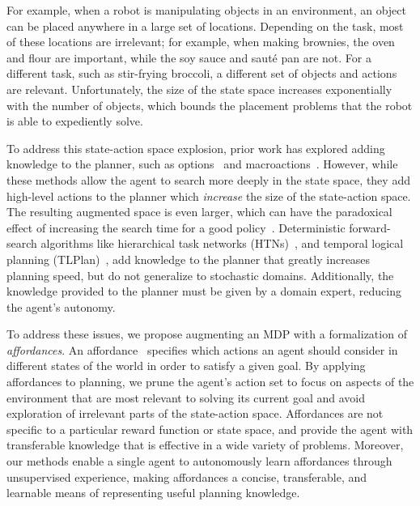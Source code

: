 \documentclass[conference]{IEEEtran}
\begin{document}
For example, when a robot is manipulating objects in an environment,
an object can be placed anywhere in a large set of locations.
Depending on the task, most of these locations are irrelevant; for
example, when making brownies, the oven and flour are important, while
the soy sauce and saut\'{e} pan are not.  For a different task, such as
stir-frying broccoli, a different set of objects and actions are
relevant.  Unfortunately, the size of the state space increases
exponentially with the number of objects, which bounds the placement
problems that the robot is able to expediently solve.

To address this state-action space explosion, prior work has explored
adding knowledge to the planner, such as options~\cite{sutton99} and
macroactions~\cite{Botea:2005kx,Newton:2005vn}.  However, while these
methods allow the agent to search more deeply in the state space, they
add high-level actions to the planner which {\em increase} the size of
the state-action space.  The resulting augmented space is even larger,
which can have the paradoxical effect of increasing the search time
for a good policy~\cite{Jong:2008zr}.  
Deterministic forward-search algorithms like hierarchical task
networks (HTNs)~\citep{Nau:1999:SSH:1624312.1624357}, and temporal
logical planning
(TLPlan)~\citep{Bacchus95usingtemporal,Bacchus99usingtemporal}, add
knowledge to the planner that greatly increases planning speed, but do
not generalize to stochastic domains. Additionally, the knowledge
provided to the planner must be given by a domain expert, reducing the
agent's autonomy. 

To address these issues, we propose augmenting an MDP with a
formalization of {\em affordances}. An affordance~\cite{gibson77}
specifies which actions an agent should consider in different states
of the world in order to satisfy a given goal. By applying affordances
to planning, we prune the agent's action set to focus on aspects of
the environment that are most relevant to solving its current goal and
avoid exploration of irrelevant parts of the state-action
space. Affordances are not specific to a particular reward function or
state space, and provide the agent with transferable knowledge that is
effective in a wide variety of problems. Moreover, our methods enable
a single agent to autonomously learn affordances through unsupervised
experience, making affordances a concise, transferable, and learnable
means of representing useful planning knowledge.

\end{document}
